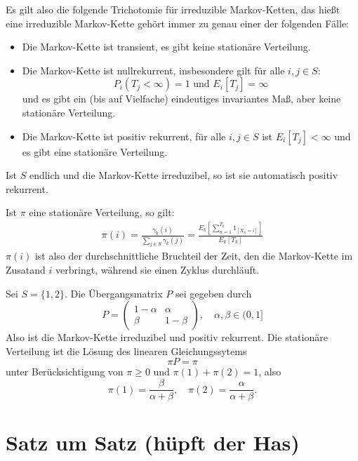 \documentclass[a4paper,twoside,DIV15,BCOR12mm]{scrbook}
\begin{document}
\begin{bemerkung}
\begin{enumi}
\item Es gilt also die folgende Trichotomie für irreduzible Markov-Ketten, das hießt eine irreduzible Markov-Kette gehört immer zu genau einer der folgenden Fälle:
\begin{itemize}
\item Die Markov-Kette ist transient, es gibt keine stationäre Verteilung.
\item Die Markov-Kette ist nullrekurrent, insbesondere gilt für alle $i,j\in S$:
\[P_i(T_j<\infty) = 1\text{ und }E_i[T_j]=\infty\]
und es gibt ein (bis auf Vielfache) eindeutiges invariantes Maß, aber keine stationäre Verteilung.
\item Die Markov-Kette ist positiv rekurrent, für alle $i,j\in S$ ist $E_i[T_j]<\infty$ und es gibt eine stationäre Verteilung.
\end{itemize}

\item Ist $S$ endlich und die Markov-Kette irreduzibel, so ist sie automatisch positiv rekurrent.

\item Ist $\pi$ eine stationäre Verteilung, so gilt:
\begin{align*}
\pi(i) = \frac{\gamma_k(i)}{\sum_{j\in S} \gamma_k(j)}
= \frac{E_k[\sum_{n=1}^{T_k} 1_{[X_n=i]}]}{E_k[T_k]}
\end{align*}
$\pi(i)$ ist also der durchschnittliche Bruchteil der Zeit, den die Markov-Kette im Zusatand $i$ verbringt, während sie einen Zyklus durchläuft.
\end{enumi}
\end{bemerkung}

\begin{beispiel}
Sei $S=\{1,2\}$. Die Übergangsmatrix $P$ sei gegeben durch 
\[
P=
\begin{pmatrix}
1-\alpha & \alpha \\
\beta & 1-\beta
\end{pmatrix}, \quad \alpha,\beta \in (0,1]
\]
Also ist die Markov-Kette irreduzibel und positiv rekurrent. Die stationäre Verteilung ist die Lösung des linearen Gleichungssytems
\[ \pi P = \pi\]
unter Berücksichtigung von $\pi \ge 0$ und $\pi(1) + \pi(2) = 1$,
also
\[
\pi(1) = \frac\beta{\alpha + \beta}, \quad \pi(2)=\frac{\alpha}{\alpha+\beta}.
\]
\end{beispiel}

\chapter{Satz um Satz (hüpft der Has)}

\renewcommand{\indexname}{Stichwortverzeichnis}
\addtocounter{chapter}{1}
\printindex
\end{document}
